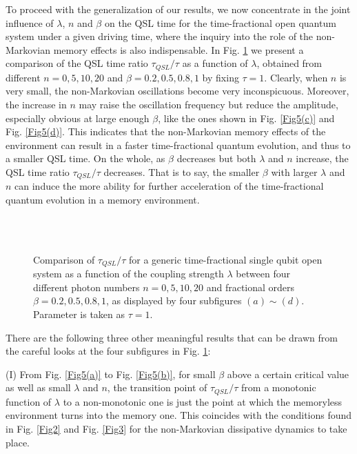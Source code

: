 \documentclass[
showpacs,  %
showkeys,  %
aps,       %
amsthm,    %
amsmath,   %
amsfonts,  %
amssymb    %
]{revtex4-1}          %
\begin{document}
To proceed with the generalization of our results, we now concentrate in the joint influence of $\lambda$, $n$ and $\beta$ on the QSL time for the time-fractional open quantum system under a given driving time, where the inquiry into the role of the non-Markovian memory effects is also indispensable. In Fig. \ref{Fig5} we present a comparison of the QSL time ratio ${\tau _{QSL}}/{\tau}$ as a function of $\lambda$, obtained from different $n=0, 5, 10, 20$ and $\beta=0.2, 0.5, 0.8, 1$ by fixing $\tau=1$. Clearly, when $n$ is very small, the non-Markovian oscillations become very inconspicuous. Moreover, the increase in $n$ may raise the oscillation frequency but reduce the amplitude, especially obvious at large enough $\beta$, like the ones shown in Fig. \ref{Fig5(c)} and Fig. \ref{Fig5(d)}. This indicates that the non-Markovian memory effects of the environment can result in a faster time-fractional quantum evolution, and thus to a smaller QSL time. On the whole, as $\beta$ decreases but both $\lambda$ and $n$ increase, the QSL time ratio ${\tau _{QSL}}/{\tau}$ decreases. That is to say, the smaller $\beta$ with larger $\lambda$ and $n$ can induce the more ability for further acceleration of the time-fractional quantum evolution in a memory environment.
\begin{figure}[htbp]
\vspace{0.5cm}
\subfigtopskip=2pt
\subfigbottomskip=5pt
\subfigcapskip=-5pt
\centering
{}
    \quad
{}\\
    \quad
{}\\
\caption{Comparison of ${\tau _{QSL}}/{\tau}$ for a generic time-fractional single qubit open system as a function of the coupling strength $\lambda$ between four different photon numbers $n=0, 5, 10, 20$ and fractional orders $\beta=0.2, 0.5, 0.8, 1$, as displayed by four subfigures $(a)\sim(d)$. Parameter is taken as $\tau=1$.}
\label{Fig5}
\end{figure}

There are the following three other meaningful results that can be drawn from the careful looks at the four subfigures in Fig. \ref{Fig5}:

(I) From Fig. \ref{Fig5(a)} to Fig. \ref{Fig5(b)}, for small $\beta$ above a certain critical value as well as small $\lambda$ and $n$, the transition point of ${\tau _{QSL}}/{\tau}$ from a monotonic function of $\lambda$ to a non-monotonic one is just the point at which the memoryless environment turns into the memory one. This coincides with the conditions found in Fig. \ref{Fig2} and Fig. \ref{Fig3} for the non-Markovian dissipative dynamics to take place.
\end{document}
